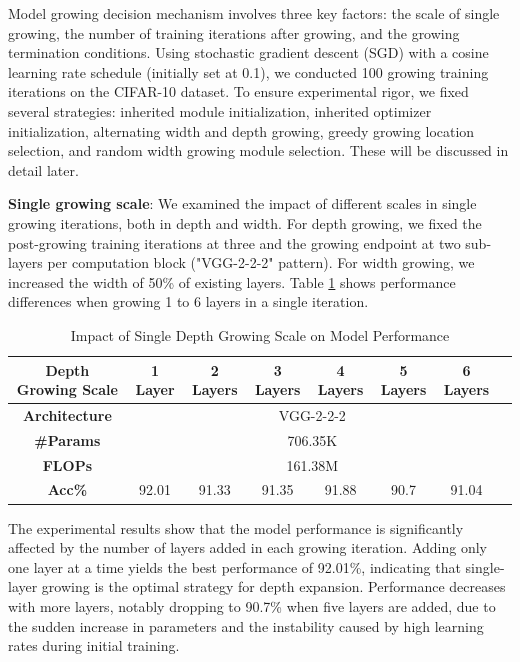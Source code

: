 \documentclass[preprint,12pt]{elsarticle}
\begin{document}
Model growing decision mechanism involves three key factors: the scale of single growing, the number of training iterations after growing, and the growing termination conditions. Using stochastic gradient descent (SGD) with a cosine learning rate schedule (initially set at 0.1), we conducted 100 growing training iterations on the CIFAR-10 dataset. To ensure experimental rigor, we fixed several strategies: inherited module initialization, inherited optimizer initialization, alternating width and depth growing, greedy growing location selection, and random width growing module selection. These will be discussed in detail later.

\textbf{Single growing scale}: We examined the impact of different scales in single growing iterations, both in depth and width. For depth growing, we fixed the post-growing training iterations at three and the growing endpoint at two sub-layers per computation block ("VGG-2-2-2" pattern). For width growing, we increased the width of 50\% of existing layers. Table \ref{table:single_depth_growth} shows performance differences when growing 1 to 6 layers in a single iteration.

\begin{table}[ht]
\centering
\tiny
\renewcommand{\arraystretch}{1.3}
\begin{adjustbox}{center}
\begin{tabular}{c|ccccccc}
\hline
\textbf{Depth Growing Scale} & \textbf{1 Layer} & \textbf{2 Layers} & \textbf{3 Layers} & \textbf{4 Layers} & \textbf{5 Layers} & \textbf{6 Layers} \\
\hline
\textbf{Architecture} & \multicolumn{6}{c}{VGG-2-2-2} \\
\hline
\textbf{\#Params} & \multicolumn{6}{c}{706.35K} \\
\hline
\textbf{FLOPs} & \multicolumn{6}{c}{161.38M} \\
\hline
\textbf{Acc\%} & 92.01 & 91.33 & 91.35 & 91.88 & 90.7 & 91.04 \\
\hline
\end{tabular}
\end{adjustbox}
\caption{Impact of Single Depth Growing Scale on Model Performance}
\label{table:single_depth_growth}
\end{table}

The experimental results show that the model performance is significantly affected by the number of layers added in each growing iteration. Adding only one layer at a time yields the best performance of 92.01\%, indicating that single-layer growing is the optimal strategy for depth expansion. Performance decreases with more layers, notably dropping to 90.7\% when five layers are added, due to the sudden increase in parameters and the instability caused by high learning rates during initial training.
\end{document}
